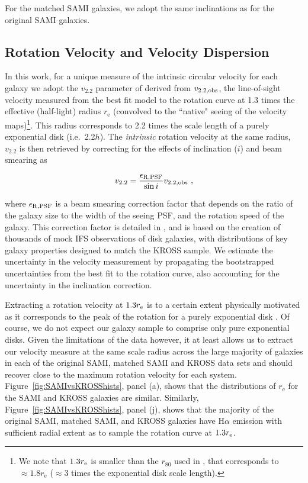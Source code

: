 \documentclass[a4paper,fleqn,usenatbib]{mnras}
\begin{document}
{For the matched SAMI galaxies, we adopt the same inclinations as for the original SAMI galaxies.
   
\subsection{Rotation Velocity and Velocity Dispersion}
\label{subsec:SAMIrotvels}

In this work, for a unique measure of the intrinsic circular velocity for each galaxy we adopt the $v_{2.2}$ parameter of \citet{Harrison:2017} derived from $v_{2.2,\rm{obs}}$, the line-of-sight velocity measured from the best fit model to the rotation curve at 1.3 times the effective (half-light) radius $r_{\text{e}}$ (convolved to the ``native" seeing of the velocity maps)\footnote{We note that $1.3r_{\rm{e}}$ is smaller than the $r_{80}$ used in \citet{Tiley:2016}, that corresponds to $\approx1.8r_{\text{e}}$ ($\approx3$ times the exponential disk scale length).}. This radius corresponds to 2.2 times the scale length of a purely exponential disk (i.e.\ 2.2$h$). The {\em intrinsic} rotation velocity at the same radius, $v_{2.2}$  is then retrieved by correcting for the effects of inclination ($i$) and beam smearing as

\begin{equation}\label{eq:veldef}
v_{2.2}=\frac{\epsilon_{\rm{R,PSF}}}{\sin i}v_{2.2,\rm{obs}}\,\,,
\end{equation}


\noindent where $\epsilon_{\rm{R,PSF}}$ is a beam smearing correction factor that depends on the ratio of the galaxy size to the width of the seeing PSF, and the rotation speed of the galaxy. This correction factor is detailed in \citet{Johnson:2018}, and is based on the creation of thousands of mock IFS observations of disk galaxies, with distributions of key galaxy properties designed to match the KROSS sample. We estimate the uncertainty in the velocity measurement by propagating the bootstrapped uncertainties from the best fit to the rotation curve, also accounting for the uncertainty in the inclination correction.

Extracting a rotation velocity at $1.3r_{\rm{e}}$ is to a certain extent physically motivated as it corresponds to the peak of the rotation for a purely exponential disk \citep[][]{Freeman:1970,Courteau:1997,Miller:2011}. Of course, we do not expect our galaxy sample to comprise only pure exponential disks. Given the limitations of the data however, it at least allows us to extract our velocity measure at the same scale radius across the large majority of galaxies in each of the original SAMI, matched SAMI and KROSS data sets and should recover close to the maximum rotation velocity for each system. Figure~\ref{fig:SAMIvsKROSShists}, panel (a), shows that the distributions of $r_{\text{e}}$ for the SAMI and KROSS galaxies are similar. Similarly, Figure~\ref{fig:SAMIvsKROSShists}, panel (j), shows that the majority of the original SAMI, matched SAMI, and KROSS galaxies have H$\alpha$ emission with sufficient radial extent as to sample the rotation curve at $1.3r_{\rm{e}}$. 

}
\end{document}
